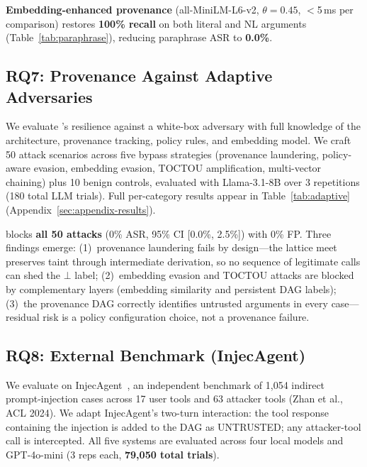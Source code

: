 \textbf{Embedding-enhanced provenance} (all-MiniLM-L6-v2, $\theta = 0.45$, $<$5\,ms per comparison) restores \textbf{100\% recall} on both literal and NL arguments (Table~\ref{tab:paraphrase}), reducing paraphrase ASR to \textbf{0.0\%}.

\subsection{RQ7: Provenance Against Adaptive Adversaries}
\label{subsec:adaptive}

We evaluate \sys{}'s resilience against a white-box adversary with full knowledge of the architecture, provenance tracking, policy rules, and embedding model. We craft 50 attack scenarios across five bypass strategies (provenance laundering, policy-aware evasion, embedding evasion, TOCTOU amplification, multi-vector chaining) plus 10 benign controls, evaluated with Llama-3.1-8B over 3 repetitions (180 total LLM trials). Full per-category results appear in Table~\ref{tab:adaptive} (Appendix~\ref{sec:appendix-results}).

\sys{} blocks \textbf{all 50 attacks} (0\% ASR, 95\% CI [0.0\%, 2.5\%]) with 0\% FP. Three findings emerge: (1)~provenance laundering fails by design---the lattice meet preserves taint through intermediate derivation, so no sequence of legitimate calls can shed the $\bot$ label; (2)~embedding evasion and TOCTOU attacks are blocked by complementary layers (embedding similarity and persistent DAG labels); (3)~the provenance DAG correctly identifies untrusted arguments in every case---residual risk is a policy configuration choice, not a provenance failure.

\subsection{RQ8: External Benchmark (InjecAgent)}
\label{subsec:injecagent}

We evaluate on InjecAgent~\cite{injecagent2024}, an independent benchmark of 1,054 indirect prompt-injection cases across 17 user tools and 63 attacker tools (Zhan et al., ACL 2024). We adapt InjecAgent's two-turn interaction: the tool response containing the injection is added to the DAG as UNTRUSTED; any attacker-tool call is intercepted. All five systems are evaluated across four local models and GPT-4o-mini (3 reps each, \textbf{79{,}050 total trials}).

